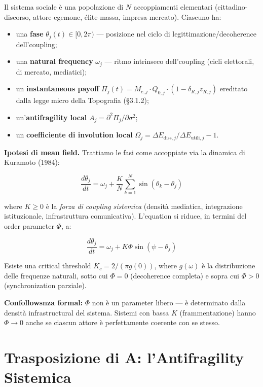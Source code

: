 Il sistema sociale è una popolazione di \(N\) accoppiamenti elementari
(cittadino-discorso, attore-egemone, élite-massa, impresa-mercato).
Ciascuno ha:

\begin{itemize}
\tightlist
\item
  una \textbf{fase} \(\theta_j(t) \in [0, 2\pi)\) --- posizione nel
  ciclo di legittimazione/decoherence dell'coupling;
\item
  una \textbf{natural frequency} \(\omega_j\) --- ritmo intrinseco
  dell'coupling (cicli elettorali, di mercato, mediatici);
\item
  un \textbf{instantaneous payoff}
  \(\Pi_j(t) = M_{e,j} \cdot Q_{0,j} \cdot (1 - \delta_{R,j} z_{R,j})\)
  ereditato dalla legge micro della Topografia (\S{}3.1.2);
\item
  un'\textbf{antifragility local}
  \(A_j = \partial^2 \Pi_j / \partial \sigma^2\);
\item
  un \textbf{coefficiente di involution local}
  \(\Omega_j = \Delta E_{\text{diss},j}/\Delta E_{\text{utili},j} - 1\).
\end{itemize}

\Hypoth{} \textbf{Ipotesi di mean field.} Trattiamo le fasi come
accoppiate via la dinamica di Kuramoto (1984):

\[
\frac{d\theta_j}{dt} = \omega_j + \frac{K}{N}\sum_{k=1}^{N} \sin(\theta_k - \theta_j)
\]

where \(K \geq 0\) è la \emph{forza di coupling sistemica} (densità
mediatica, integrazione istituzionale, infrastruttura comunicativa).
L'equation si riduce, in termini del order parameter \(\Phi\), a:

\[
\frac{d\theta_j}{dt} = \omega_j + K\Phi \sin(\psi - \theta_j)
\]

Esiste una critical threshold \(K_c = 2/(\pi g(0))\), where \(g(\omega)\) è
la distribuzione delle frequenze naturali, sotto cui \(\Phi = 0\)
(decoherence completa) e sopra cui \(\Phi > 0\) (synchronization
parziale).

\Proved{} \textbf{Confollowsnza formal:} \(\Phi\) non è un parameter
libero --- è determinato dalla densità infrastructural del sistema.
Sistemi con bassa \(K\) (frammentazione) hanno \(\Phi \to 0\) anche se
ciascun attore è perfettamente coerente con se stesso.



\section{Trasposizione di A: l'Antifragility
Sistemica}\label{trasposizione-di-a-lantifragilituxe0-sistemica}

